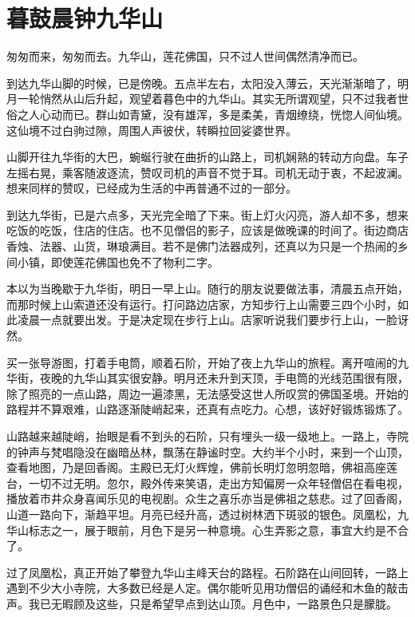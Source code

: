\chapter{暮鼓晨钟九华山}

匆匆而来，匆匆而去。九华山，莲花佛国，只不过人世间偶然清净而已。

到达九华山脚的时候，已是傍晚。五点半左右，太阳没入薄云，天光渐渐暗了，明月一轮悄然从山后升起，观望着暮色中的九华山。其实无所谓观望，只不过我者世俗之人心动而已。群山如青黛，没有雄浑，多是柔美，青烟缭绕，恍惚人间仙境。这仙境不过白驹过隙，周围人声彼伏，转瞬拉回娑婆世界。

山脚开往九华街的大巴，蜿蜒行驶在曲折的山路上，司机娴熟的转动方向盘。车子左摇右晃，乘客随波逐流，赞叹司机的声音不觉于耳。司机无动于衷，不起波澜。想来同样的赞叹，已经成为生活的中再普通不过的一部分。

到达九华街，已是六点多，天光完全暗了下来。街上灯火闪亮，游人却不多，想来吃饭的吃饭，住店的住店。也不见僧侣的影子，应该是做晚课的时间了。街边商店香烛、法器、山货，琳琅满目。若不是佛门法器成列，还真以为只是一个热闹的乡间小镇，即使莲花佛国也免不了物利二字。

本以为当晚歇于九华街，明日一早上山。随行的朋友说要做法事，清晨五点开始，而那时候上山索道还没有运行。打问路边店家，方知步行上山需要三四个小时，如此凌晨一点就要出发。于是决定现在步行上山。店家听说我们要步行上山，一脸讶然。

买一张导游图，打着手电筒，顺着石阶，开始了夜上九华山的旅程。离开喧闹的九华街，夜晚的九华山其实很安静。明月还未升到天顶，手电筒的光线范围很有限，除了照亮的一点山路，周边一遍漆黑，无法感受这世人所叹赏的佛国圣境。开始的路程并不算艰难，山路逐渐陡峭起来，还真有点吃力。心想，该好好锻炼锻炼了。

山路越来越陡峭，抬眼是看不到头的石阶，只有埋头一级一级地上。一路上，寺院的钟声与梵唱隐没在幽暗丛林，飘荡在静谧时空。大约半个小时，来到一个山顶，查看地图，乃是回香阁。主殿已无灯火辉煌，佛前长明灯忽明忽暗，佛祖高座莲台，一切不过无明。忽尔，殿外传来笑语，走出方知偏房一众年轻僧侣在看电视，播放着市井众身喜闻乐见的电视剧。众生之喜乐亦当是佛祖之慈悲。过了回香阁，山道一路向下，渐趋平坦。月亮已经升高，透过树林洒下斑驳的银色。凤凰松，九华山标志之一，展于眼前，月色下是另一种意境。心生弄影之意，事宜大约是不合了。

过了凤凰松，真正开始了攀登九华山主峰天台的路程。石阶路在山间回转，一路上遇到不少大小寺院，大多数已经是人定。偶尔能听见用功僧侣的诵经和木鱼的敲击声。我已无暇顾及这些，只是希望早点到达山顶。月色中，一路景色只是朦胧。

